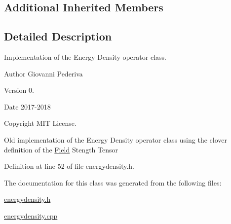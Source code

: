 \subsection*{Additional Inherited Members}


\subsection{Detailed Description}
Implementation of the Energy Density operator class. 

\begin{DoxyAuthor}{Author}
Giovanni Pederiva 
\end{DoxyAuthor}
\begin{DoxyVersion}{Version}
0. 
\end{DoxyVersion}
\begin{DoxyDate}{Date}
2017-\/2018 
\end{DoxyDate}
\begin{DoxyCopyright}{Copyright}
M\+IT License.
\end{DoxyCopyright}
Old implementation of the Energy Density operator class using the clover definition of the \hyperlink{classField}{Field} Stength Tensor 

Definition at line 52 of file energydensity.\+h.



The documentation for this class was generated from the following files\+:\begin{DoxyCompactItemize}
\item 
\hyperlink{energydensity_8h}{energydensity.\+h}\item 
\hyperlink{energydensity_8cpp}{energydensity.\+cpp}\end{DoxyCompactItemize}
